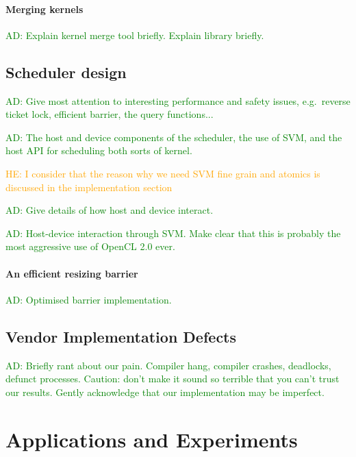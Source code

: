 \documentclass[numbers,nocopyrightspace,10pt]{sigplanconf}
\newcommand{\ADComment}[1]{\textcolor{green}{AD: #1}}
\newcommand{\HEComment}[1]{\textcolor{orange}{HE: #1}}
\begin{document}
\paragraph{Merging kernels}

\ADComment{Explain kernel merge tool briefly.  Explain library briefly.}


\subsection{Scheduler design}\label{sec:resizingbarrier}


\ADComment{Give most attention to interesting performance and safety issues, e.g.\ reverse ticket lock, efficient barrier, the query functions...}

\ADComment{The host and device components of the scheduler, the use of
  SVM, and the host API for scheduling both sorts of kernel.}

\HEComment{I consider that the reason why we need SVM fine grain and
  atomics is discussed in the implementation section}

\ADComment{Give details of how host and device interact.}

\ADComment{Host-device interaction through SVM.  Make clear that this is probably the most aggressive use of OpenCL 2.0 ever.}


\paragraph{An efficient resizing barrier}

\ADComment{Optimised barrier implementation.}


\subsection{Vendor Implementation Defects}

\ADComment{Briefly rant about our pain.  Compiler hang, compiler crashes, deadlocks, defunct processes.  Caution: don't make it sound so terrible that you can't trust our results.  Gently acknowledge that our implementation may be imperfect.}





\section{Applications and Experiments}\label{sec:experiments}
\end{document}
